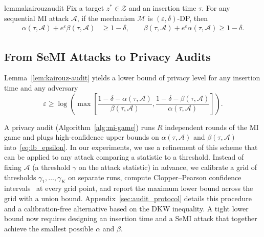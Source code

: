 \documentclass{article}
\theoremstyle{plain}
\theoremstyle{definition}
\theoremstyle{remark}
\newcommand{\cZ}{\ensuremath{\mathcal{Z}}}
\newcommand{\cM}{\ensuremath{\mathcal{M}}}
\newcommand{\cA}{\ensuremath{\mathcal{A}}}
\renewcommand{\geq}{\geqslant}
\newcommand{\todoe}[1]{\todo[inline]{\small #1}}
\begin{document}

\begin{restatable}{lemma}{kairouzaudit}\label{lem:kairouz-audit}
    Fix a target $z^* \in \cZ$ and an insertion time $\tau$. For any sequential MI attack $\cA$, if the mechanism $\cM$ is $(\varepsilon, \delta)$-DP, then
    \begin{align*}
        \alpha(\tau,\cA) + e^{\varepsilon} \beta(\tau,\cA) & \geq 1-\delta, \qquad
        \beta(\tau,\cA) + e^{\varepsilon} \alpha(\tau,\cA) \geq 1-\delta.
    \end{align*}
\end{restatable}



\subsection{From SeMI Attacks to Privacy Audits}

Lemma~\ref{lem:kairouz-audit} yields a lower bound of privacy level for any insertion time and any adversary
\begin{equation}
    \varepsilon \geq \log\left(\max \left[\frac{1 - \delta - \alpha(\tau,\cA)}{\beta(\tau,\cA)},\frac{1 - \delta - \beta(\tau,\cA)}{\alpha(\tau,\cA)}\right]\right).\label{eq:lb_epsilon}
\end{equation}

A privacy audit (Algorithm~\ref{alg:mi-game}) runs $R$ independent rounds of the MI game and plugs high-confidence upper bounds on $\alpha(\tau,\cA)$ and $\beta(\tau,\cA)$ into~\eqref{eq:lb_epsilon}. In our experiments, we use a refinement of this scheme that can be applied to any attack comparing a statistic to a threshold. Instead of fixing $\cA$ (a threshold $\gamma$ on the attack statistic) in advance, we calibrate a grid of thresholds $\gamma_1,\dots,\gamma_K$ on separate runs, compute Clopper--Pearson confidence intervals~\citep{clopper1934use} at every grid point, and report the maximum lower bound across the grid with a union bound. %
Appendix~\ref{sec:audit_protocol} details this procedure and a calibration-free alternative based on the DKW inequality.
A tight lower bound now requires designing an insertion time and a SeMI attack that together achieve the smallest possible $\alpha$ and $\beta$.
\end{document}
